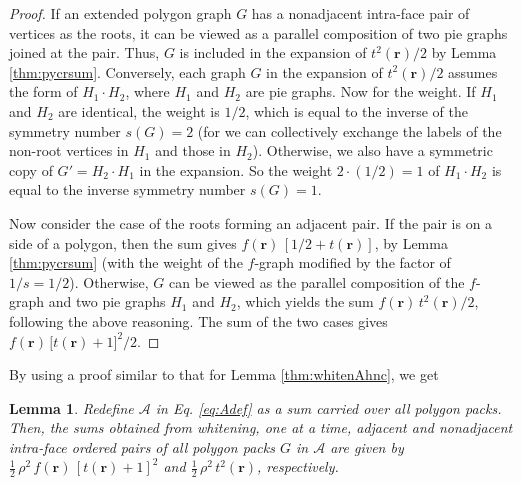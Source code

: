 \documentclass[preprint]{revtex4-1}
\newtheorem{lemm}[thrm]{Lemma}
\newcommand{\vct}[1]{\mathbf{#1}}
\providecommand{\vr}{} %
\renewcommand{\vr}{\vct{r}}
\newcommand{\A}{\mathcal{A}}
\begin{document}
\begin{proof}
If an extended polygon graph $G$ has a nonadjacent intra-face pair
of vertices as the roots,
  it can be viewed as a parallel composition
  of two pie graphs joined at the pair.
%
Thus, $G$ is included in the expansion of $t^2(\vr)/2$
  by Lemma \ref{thm:pycrsum}.
%
Conversely,
  each graph $G$ in the expansion of $t^2(\vr)/2$
  assumes the form of $H_1 \cdot H_2$,
  where $H_1$ and $H_2$ are pie graphs.
%
Now for the weight.
%
If $H_1$ and $H_2$ are identical,
  the weight is $1/2$,
  which is equal to the inverse of
  the symmetry number $s(G) = 2$
  (for we can collectively exchange
  the labels of the non-root vertices in $H_1$
  and those in $H_2$).
%
Otherwise,
  we also have a symmetric copy of $G' = H_2 \cdot H_1$
  in the expansion.
So the weight $2\cdot(1/2) = 1$ of $H_1 \cdot H_2$
  is equal to the inverse symmetry number $s(G) = 1$.


Now consider the case of the roots forming
an adjacent pair.
%
If the pair is on a side of a polygon,
  then the sum gives $f(\vr) \, [1/2 + t(\vr)]$,
  by Lemma \ref{thm:pycrsum}
  (with the weight of the $f$-graph
  modified by the factor of $1/s = 1/2$).
%
Otherwise,
  $G$ can be viewed as the parallel composition
  of the $f$-graph and two pie graphs $H_1$ and $H_2$,
%
which yields the sum $f(\vr) \, t^2(\vr)/2$,
  following the above reasoning.
%
The sum of the two cases gives
  $f(\vr) \, \bigl[ t(\vr) + 1 \bigr]^2/2$.
\end{proof}



By using a proof similar to that for
Lemma \ref{thm:whitenAhnc},
we get

\begin{lemm}
Redefine $\A$ in Eq. \eqref{eq:Adef}
as a sum carried over all polygon packs.
Then, the sums obtained from whitening,
one at a time,
adjacent and nonadjacent intra-face ordered pairs
of all polygon packs $G$ in $\A$
are given by
$\frac{1}{2} \, \rho^2 \, f(\vr) \, [t(\vr) + 1]^2$
and
$\frac{1}{2} \, \rho^2 \, t^2(\vr)$,
respectively.
\label{thm:whitenApy}
\end{lemm}
\end{document}
